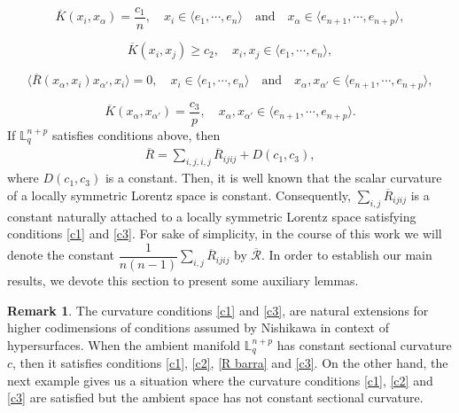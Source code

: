 \documentclass[leqno,11pt]{amsart}
\theoremstyle{plain}
\theoremstyle{definition}
\newtheorem{remark}[theorem]{\indent\sc Remark}
\numberwithin{equation}{section}
\begin{document}
\begin{equation}\label{c1}
\overline{K}(x_i,x_{\alpha})=\dfrac{c_1}{n},\quad x_i\in \langle e_1,\cdots, e_n\rangle\quad\mbox{and}\quad x_{\alpha}\in \langle e_{n+1},\cdots,e_{n+p}\rangle,
\end{equation}

\begin{equation}\label{c2}
\overline{K}(x_i,x_j)\geq c_2,\quad x_i,x_j\in \langle e_1,\cdots,e_n\rangle,
\end{equation}

\begin{equation}\label{R barra}
\langle \overline{R}(x_{\alpha},x_i)x_{\alpha'},x_i\rangle=0,\quad x_i\in \langle e_1,\cdots, e_n\rangle\quad\mbox{and}\quad x_{\alpha},x_{\alpha'}\in \langle e_{n+1},\cdots,e_{n+p}\rangle,
\end{equation}

\begin{equation}\label{c3}
\overline{K}(x_{\alpha},x_{\alpha'})=\dfrac{c_3}{p},\quad x_{\alpha},x_{\alpha'}\in \langle e_{n+1},\cdots,e_{n+p}\rangle.
\end{equation}
If $\mathbb{L}_{q}^{n+p}$ satisfies conditions above, then
\begin{eqnarray*}
\overline{R}=\sum_{i,j,i,j}\overline{R}_{ijij}+D(c_1,c_3),
\end{eqnarray*}
where $D(c_1,c_3)$ is a constant.
Then, it is well known that the scalar curvature of a locally symmetric Lorentz
space is constant. Consequently, $\displaystyle\sum_{i,j}\overline{R}_{ijij}$ is a constant naturally attached
to a locally symmetric Lorentz space satisfying conditions \eqref{c1} and \eqref{c3}.
For sake of simplicity, in the course of this work we will denote the constant $\dfrac{1}{n(n-1)}\displaystyle\sum_{i,j}\overline{R}_{ijij}$ by $\overline{\mathcal{R}}$. In order to establish our main results, we devote this
section to present some auxiliary lemmas. 

\begin{remark}
The curvature conditions \eqref{c1} and \eqref{c3}, are natural extensions for higher codimensions of conditions assumed by Nishikawa \cite{Nishikawa: 84} in context of hypersurfaces. When the ambient manifold $\mathbb{L}_{q}^{n+p}$ has constant sectional curvature $c$, then it satisfies conditions \eqref{c1}, \eqref{c2}, \eqref{R barra} and \eqref{c3}. On the other hand, the next example gives us a situation where the curvature conditions \eqref{c1}, \eqref{c2} and \eqref{c3} are satisfied but the ambient space has not constant sectional curvature.
\end{remark}
\end{document}

